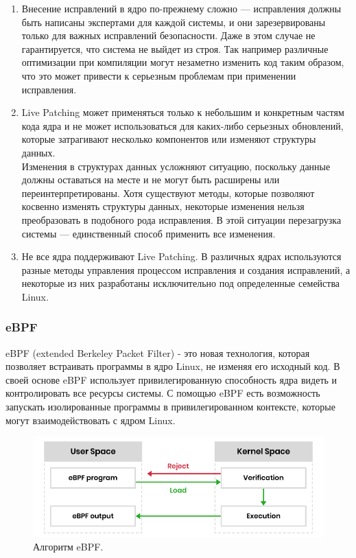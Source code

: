 \begin{enumerate}
    \item Внесение исправлений в ядро по-прежнему сложно — исправления должны быть написаны экспертами для каждой системы,
    и они зарезервированы только для важных исправлений безопасности.
    Даже в этом случае не гарантируется, что система не выйдет из строя.
    Так например различные оптимизации при компиляции могут незаметно изменить код таким образом, что это может привести к серьезным проблемам при применении исправления.\cite{livepatch-problems}
    \item Live Patching может применяться только к небольшим и конкретным частям кода ядра и не может использоваться для каких-либо серьезных обновлений,
    которые затрагивают несколько компонентов или изменяют структуры данных.
    \vspace{0.5cm}\\
    Изменения в структурах данных усложняют ситуацию, поскольку данные должны оставаться на месте и не могут быть расширены или переинтерпретированы.
    Хотя существуют методы, которые позволяют косвенно изменять структуры данных, некоторые изменения нельзя преобразовать в подобного рода исправления.
    В этой ситуации перезагрузка системы — единственный способ применить все изменения.
    \item Не все ядра поддерживают Live Patching.
    В различных ядрах используются разные методы управления процессом исправления и создания исправлений,
    а некоторые из них разработаны исключительно под определенные семейства Linux.\cite{infosec}
\end{enumerate}

\subsubsection{eBPF}\label{subsec:ebpf}

eBPF (extended Berkeley Packet Filter) - это новая технология, которая позволяет встраивать программы в ядро Linux, не изменяя его исходный код.
В своей основе eBPF использует привилегированную способность ядра видеть и контролировать все ресурсы системы.
С помощью eBPF есть возможность запускать изолированные программы в привилегированном контексте, которые могут взаимодействовать с ядром Linux.

\begin{figure}[H]
    \centering
    \includegraphics[width=\textwidth]{inc/img/eBPF_work}
    \caption{Алгоритм eBPF.}
    \label{fig:eBPF_work}
\end{figure}

